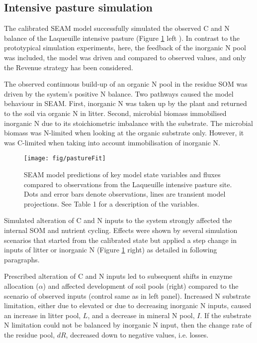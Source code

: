 \subsection{Intensive pasture simulation}
\label{sec:ResultsPasture}

The calibrated SEAM model successfully simulated the
observed C and N balance of the Laqueuille intensive pasture (Figure
\ref{fig:pastureFit} left ). In contrast to the prototypical simulation
experiments, here, the feedback of the inorganic N pool was included, the model
was driven and compared to observed values, and only the Revenue strategy has
been considered.

The observed continuous build-up of an organic N pool in the residue SOM was
driven by the system's positive N balance. Two pathways caused the model
behaviour in SEAM. First, inorganic N was taken up by the plant and returned to
the soil via organic N in litter. Second, microbial biomass immobilised
inorganic N due to its stoichiometric imbalance with the substrate. The
microbial biomass was N-limited when looking at the organic substrate only.
However, it was C-limited when taking into account immobilisation of inorganic
N.

\begin{figure}[t] \vspace*{2mm}
\begin{center}
\texttt{[image: fig/pastureFit]} 
\end{center}
\caption{
SEAM model predictions of key model state variables and fluxes compared to observations from the Laqueuille intensive pasture site. Dots and error bars denote observations, lines are transient model projections. See Table 1 for a description of the variables.
\label{fig:pastureFit}}
\end{figure}   

Simulated alteration of C and N inputs to the system strongly affected the
internal SOM and nutrient cycling. Effects were shown by several
simulation scenarios that started from the calibrated state but applied a step change in
inputs of litter or inorganic N (Figure \ref{fig:pastureFit} right) as detailed
in following paragraphs.

Prescribed alteration of C and N
inputs led to subsequent shifts in enzyme allocation ($\alpha$) and affected
development of soil pools (right) compared to the scenario of observed inputs
(control same as in left panel).
Increased N substrate limitation, either due to elevated  or due to
decreasing inorganic N inputs, caused an increase in litter pool, $L$, and a
decrease in mineral N pool, $I$. If the substrate N limitation could not be
balanced by inorganic N input, then the change rate of the residue pool, $dR$,
decreased down to negative values, i.e. losses.

